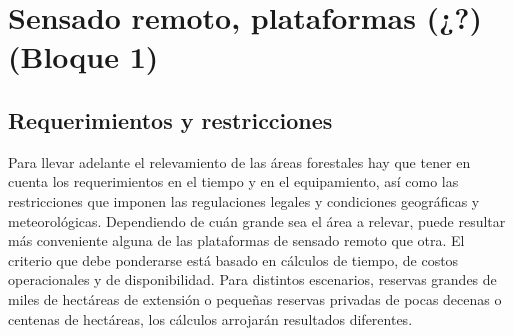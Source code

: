 \section{Sensado remoto, plataformas (¿?) (Bloque 1)}
\subsection{Requerimientos y restricciones}
Para llevar adelante el relevamiento de las áreas forestales hay que tener en cuenta los requerimientos en el tiempo y en el equipamiento, así como las restricciones que imponen las regulaciones legales y condiciones geográficas y meteorológicas. Dependiendo de cuán grande sea el área a relevar, puede resultar más conveniente alguna de las plataformas de sensado remoto que otra. El criterio que debe ponderarse está basado en cálculos de tiempo, de costos operacionales y de disponibilidad. Para distintos escenarios, reservas grandes de miles de hectáreas de extensión o pequeñas reservas privadas de pocas decenas o centenas de hectáreas, los cálculos arrojarán resultados diferentes.
